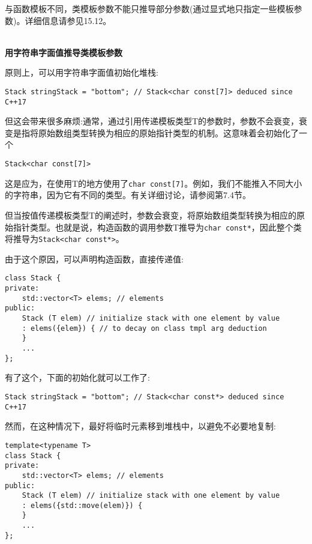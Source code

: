 与函数模板不同，类模板参数不能只推导部分参数(通过显式地只指定一些模板参数)。详细信息请参见15.12。

\hspace*{\fill} \\ %
\noindent
\textbf{用字符串字面值推导类模板参数}

原则上，可以用字符串字面值初始化堆栈:

\begin{lstlisting}[style=styleCXX]
Stack stringStack = "bottom"; // Stack<char const[7]> deduced since C++17
\end{lstlisting}

但这会带来很多麻烦:通常，通过引用传递模板类型T的参数时，参数不会衰变，衰变是指将原始数组类型转换为相应的原始指针类型的机制。这意味着会初始化了一个

\begin{lstlisting}[style=styleCXX]
Stack<char const[7]>
\end{lstlisting}

这是应为，在使用T的地方使用了\texttt{char const[7]}。例如，我们不能推入不同大小的字符串，因为它有不同的类型。有关详细讨论，请参阅第7.4节。

但当按值传递模板类型T的阐述时，参数会衰变，将原始数组类型转换为相应的原始指针类型。也就是说，构造函数的调用参数T推导为\texttt{char const*}，因此整个类将推导为\texttt{Stack<char const*>}。

由于这个原因，可以声明构造函数，直接传递值:

\begin{lstlisting}[style=styleCXX]
class Stack {
private:
	std::vector<T> elems; // elements
public:
	Stack (T elem) // initialize stack with one element by value
	: elems({elem}) { // to decay on class tmpl arg deduction
	}
	...
};
\end{lstlisting}

有了这个，下面的初始化就可以工作了:

\begin{lstlisting}[style=styleCXX]
Stack stringStack = "bottom"; // Stack<char const*> deduced since C++17
\end{lstlisting}

然而，在这种情况下，最好将临时元素移到堆栈中，以避免不必要地复制:

\begin{lstlisting}[style=styleCXX]
template<typename T>
class Stack {
private:
	std::vector<T> elems; // elements
public:
	Stack (T elem) // initialize stack with one element by value
	: elems({std::move(elem)}) {
	}
	...
};
\end{lstlisting}

